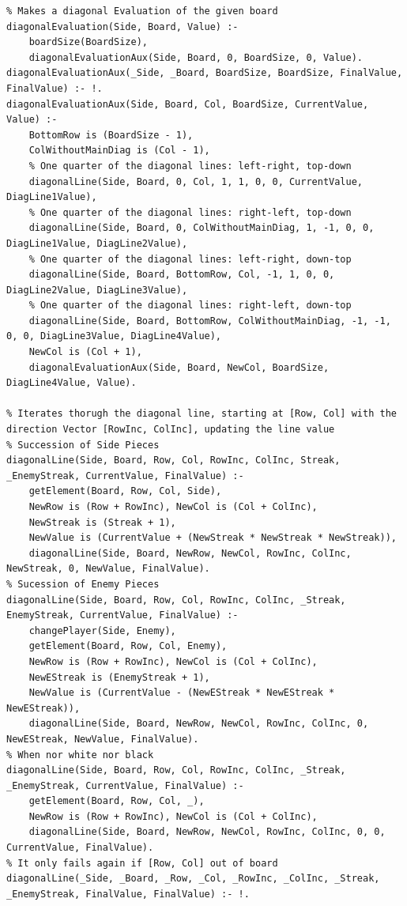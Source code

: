 \documentclass[a4paper]{article}
\begin{document}
\begin{lstlisting}
% Makes a diagonal Evaluation of the given board
diagonalEvaluation(Side, Board, Value) :-
	boardSize(BoardSize),
	diagonalEvaluationAux(Side, Board, 0, BoardSize, 0, Value).
diagonalEvaluationAux(_Side, _Board, BoardSize, BoardSize, FinalValue, FinalValue) :- !.
diagonalEvaluationAux(Side, Board, Col, BoardSize, CurrentValue, Value) :-
	BottomRow is (BoardSize - 1),
	ColWithoutMainDiag is (Col - 1),
	% One quarter of the diagonal lines: left-right, top-down
	diagonalLine(Side, Board, 0, Col, 1, 1, 0, 0, CurrentValue, DiagLine1Value),
	% One quarter of the diagonal lines: right-left, top-down
	diagonalLine(Side, Board, 0, ColWithoutMainDiag, 1, -1, 0, 0, DiagLine1Value, DiagLine2Value),
	% One quarter of the diagonal lines: left-right, down-top
	diagonalLine(Side, Board, BottomRow, Col, -1, 1, 0, 0, DiagLine2Value, DiagLine3Value),
	% One quarter of the diagonal lines: right-left, down-top
	diagonalLine(Side, Board, BottomRow, ColWithoutMainDiag, -1, -1, 0, 0, DiagLine3Value, DiagLine4Value),
	NewCol is (Col + 1),
	diagonalEvaluationAux(Side, Board, NewCol, BoardSize, DiagLine4Value, Value).

% Iterates thorugh the diagonal line, starting at [Row, Col] with the direction Vector [RowInc, ColInc], updating the line value
% Succession of Side Pieces
diagonalLine(Side, Board, Row, Col, RowInc, ColInc, Streak, _EnemyStreak, CurrentValue, FinalValue) :-
	getElement(Board, Row, Col, Side),
	NewRow is (Row + RowInc), NewCol is (Col + ColInc),
	NewStreak is (Streak + 1),
	NewValue is (CurrentValue + (NewStreak * NewStreak * NewStreak)),
	diagonalLine(Side, Board, NewRow, NewCol, RowInc, ColInc, NewStreak, 0, NewValue, FinalValue).
% Sucession of Enemy Pieces
diagonalLine(Side, Board, Row, Col, RowInc, ColInc, _Streak, EnemyStreak, CurrentValue, FinalValue) :-
	changePlayer(Side, Enemy),
	getElement(Board, Row, Col, Enemy),
	NewRow is (Row + RowInc), NewCol is (Col + ColInc),
	NewEStreak is (EnemyStreak + 1),
	NewValue is (CurrentValue - (NewEStreak * NewEStreak * NewEStreak)),
	diagonalLine(Side, Board, NewRow, NewCol, RowInc, ColInc, 0, NewEStreak, NewValue, FinalValue).
% When nor white nor black
diagonalLine(Side, Board, Row, Col, RowInc, ColInc, _Streak, _EnemyStreak, CurrentValue, FinalValue) :-
	getElement(Board, Row, Col, _),
	NewRow is (Row + RowInc), NewCol is (Col + ColInc),
	diagonalLine(Side, Board, NewRow, NewCol, RowInc, ColInc, 0, 0, CurrentValue, FinalValue).
% It only fails again if [Row, Col] out of board
diagonalLine(_Side, _Board, _Row, _Col, _RowInc, _ColInc, _Streak, _EnemyStreak, FinalValue, FinalValue) :- !.



\end{lstlisting}
\end{document}
